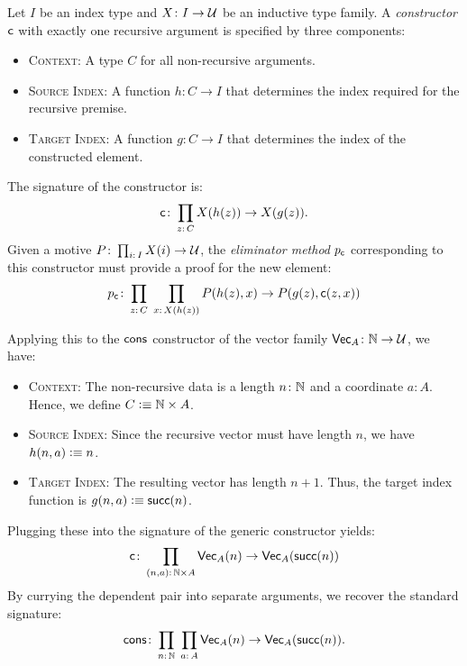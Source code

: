 \begin{defn}\label{defn:one-recursive-arg}
    Let $I$ be an index type and $X\colon I\to\univ$ be an inductive type family. A \textsl{constructor} $\mathsf{c}$ with exactly one recursive argument is specified by three components:
    \begin{itemize}
        \item \textsc{Context:} A type $C$ for all non-recursive arguments.
        
        \item \textsc{Source Index:} A function $h\colon C\to I$ that determines the index required for the recursive premise.
        
        \item \textsc{Target Index:} A function $g\colon C\to I$ that determines the index of the constructed element.
    \end{itemize}
    The signature of the constructor is:
    \begin{equation}\label{eq:one-recursive-arg}
        \fun c\colon\prod_{z\colon C}X(h(z))\to X(g(z)).
    \end{equation}
    Given a motive $P\colon\prod_{i\colon I}X(i)\to\univ$, the \textsl{eliminator method} $p_{\mathsf{c}}$ corresponding to this constructor must provide a proof for the new element:
    \[
        p_{\fun c}\colon
            \prod_{z\colon C\mathstrut}\;
            \prod_{x\colon X(h(z))\mathstrut}
                P(h(z),x)\to P(g(z),\fun c(z,x))
    \]
\end{defn}

\begin{xmpl}
    Applying this to the $\mathsf{cons}$ constructor of the vector family $\fun{Vec}_A\colon\N\to\univ$, we have:
    \begin{itemize}
        \item \textsc{Context:} The non-recursive data is a length $n\colon\N$ and a coordinate $a\colon A$. Hence, we define $C\mathrel{\vcentcolon}\equiv\mathbb{N}\times A$.
        
        \item \textsc{Source Index:} Since the recursive vector must have length $n$, we have $h(n,a)\mathrel{\vcentcolon}\equiv n$.
        
        \item \textsc{Target Index:} The resulting vector has length $n+1$. Thus, the target index function is $g(n,a)\mathrel{\vcentcolon}\equiv\mathsf{succ}(n)$.
    \end{itemize}
    Plugging these into the signature of the generic constructor yields:
    \[
        \fun c\colon\prod_{(n,a)\colon\N\times A}
            \fun{Vec}_A(n)\to\fun{Vec}_A(\fun{succ}(n))
    \]
    By currying the dependent pair into separate arguments, we recover the standard signature:
    \[
        \fun{cons}\colon
            \prod_{n\colon\N}\;
            \prod_{a\colon A}
                \fun{Vec}_A(n)
                \to
                \fun{Vec}_A(\fun{succ}(n)).
    \]
\end{xmpl}

